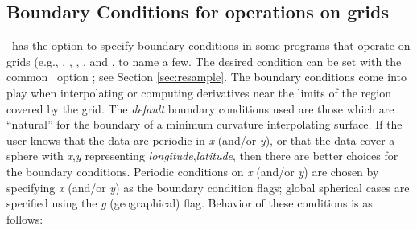 \subsection{Boundary Conditions for operations on grids}

\GMT\ has the option to specify boundary conditions in some programs
that operate on grids (e.g., , ,
, , and
, to name a few.  The desired condition can be set with
the common \GMT\ option ; see Section \ref{sec:resample}.  The boundary conditions come into play
when interpolating or computing derivatives near the limits of the
region covered by the grid. The \emph{default} boundary
conditions used are those which are ``natural'' for the boundary
of a minimum curvature interpolating surface.
If the user knows that the data are periodic in \emph{x} (and/or
\emph{y}), or that the data cover a sphere with \emph{x},\emph{y}
representing \emph{longitude},\emph{latitude}, then there are better
choices for the boundary conditions.
Periodic conditions on \emph{x} (and/or \emph{y}) are chosen by
specifying \emph{x} (and/or \emph{y}) as the boundary condition flags;
global spherical cases are specified using the \emph{g} (geographical)
flag.  Behavior of these conditions is as follows:

